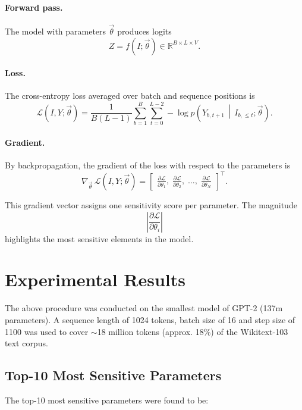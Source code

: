 \documentclass[12pt]{article}
\begin{document}
\paragraph{Forward pass.} 
The model with parameters $\vec{\theta}$ produces logits
\[
Z = f(I;\vec{\theta}) \in \mathbb{R}^{B \times L \times V}.
\]

\paragraph{Loss.} 
The cross-entropy loss averaged over batch and sequence positions is
\[
\mathcal{L}(I,Y;\vec{\theta}) 
= \frac{1}{B(L-1)} \sum_{b=1}^B \sum_{t=0}^{L-2} 
    -\log p\!\left(Y_{b,t+1}\,\middle|\,I_{b,\leq t}; \vec{\theta}\right).
\]

\paragraph{Gradient.} 
By backpropagation, the gradient of the loss with respect to the parameters is
\[
\nabla_{\vec{\theta}} \, \mathcal{L}(I,Y;\vec{\theta})
= \begin{bmatrix}
\frac{\partial \mathcal{L}}{\partial \theta_1},\;
\frac{\partial \mathcal{L}}{\partial \theta_2},\;
\ldots,\;
\frac{\partial \mathcal{L}}{\partial \theta_N}
\end{bmatrix}^{\!\top}.
\]

This gradient vector assigns one sensitivity score per parameter. 
The magnitude 
\[
\left| \frac{\partial \mathcal{L}}{\partial \theta_i} \right|
\]
highlights the most sensitive elements in the model.

\section{Experimental Results}
The above procedure was conducted on the smallest model of GPT-2 (137m parameters). A sequence length of 1024 tokens, batch size of 16 and step size of 1100 was used to cover $\sim$18 million tokens (approx. 18\%) of the Wikitext-103 text corpus. 

\subsection*{Top-10 Most Sensitive Parameters}
The top-10 most sensitive parameters were found to be:
\end{document}

